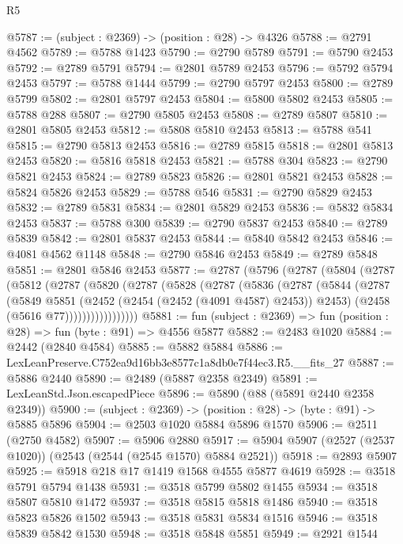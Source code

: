 \begin{lexlean}{R5}
\begin{coremodule}
@5787 := (subject : @2369) -> (position : @28) -> @4326
@5788 := @2791 @4562
@5789 := @5788 @1423
@5790 := @2790 @5789
@5791 := @5790 @2453
@5792 := @2789 @5791
@5794 := @2801 @5789 @2453
@5796 := @5792 @5794 @2453
@5797 := @5788 @1444
@5799 := @2790 @5797 @2453
@5800 := @2789 @5799
@5802 := @2801 @5797 @2453
@5804 := @5800 @5802 @2453
@5805 := @5788 @288
@5807 := @2790 @5805 @2453
@5808 := @2789 @5807
@5810 := @2801 @5805 @2453
@5812 := @5808 @5810 @2453
@5813 := @5788 @541
@5815 := @2790 @5813 @2453
@5816 := @2789 @5815
@5818 := @2801 @5813 @2453
@5820 := @5816 @5818 @2453
@5821 := @5788 @304
@5823 := @2790 @5821 @2453
@5824 := @2789 @5823
@5826 := @2801 @5821 @2453
@5828 := @5824 @5826 @2453
@5829 := @5788 @546
@5831 := @2790 @5829 @2453
@5832 := @2789 @5831
@5834 := @2801 @5829 @2453
@5836 := @5832 @5834 @2453
@5837 := @5788 @300
@5839 := @2790 @5837 @2453
@5840 := @2789 @5839
@5842 := @2801 @5837 @2453
@5844 := @5840 @5842 @2453
@5846 := @4081 @4562 @1148
@5848 := @2790 @5846 @2453
@5849 := @2789 @5848
@5851 := @2801 @5846 @2453
@5877 := @2787
    (@5796
      (@2787
        (@5804
          (@2787
            (@5812
              (@2787
                (@5820
                  (@2787
                    (@5828
                      (@2787
                        (@5836
                          (@2787
                            (@5844
                              (@2787
                                (@5849
                                  @5851
                                  (@2452 (@2454 (@2452 (@4091 @4587) @2453)) @2453)
                                  (@2458 (@5616 @77)))))))))))))))))
@5881 := fun (subject : @2369) => fun (position : @28) => fun (byte : @91) => @4556 @5877
@5882 := @2483 @1020
@5884 := @2442 (@2840 @4584)
@5885 := @5882 @5884
@5886 := LexLeanPreserve.C752ea9d16bb3e8577c1a8db0e7f44ec3.R5.__fits_27
@5887 := @5886 @2440
@5890 := @2489 (@5887 @2358 @2349)
@5891 := LexLeanStd.Json.escapedPiece
@5896 := @5890 (@88 (@5891 @2440 @2358 @2349))
@5900 := (subject : @2369) -> (position : @28) -> (byte : @91) -> @5885 @5896
@5904 := @2503 @1020 @5884 @5896 @1570
@5906 := @2511 (@2750 @4582)
@5907 := @5906 @2880
@5917 := @5904 @5907 (@2527 (@2537 @1020)) (@2543 (@2544 (@2545 @1570) @5884 @2521))
@5918 := @2893 @5907
@5925 := @5918 @218 @17 @1419 @1568 @4555 @5877 @4619
@5928 := @3518 @5791 @5794 @1438
@5931 := @3518 @5799 @5802 @1455
@5934 := @3518 @5807 @5810 @1472
@5937 := @3518 @5815 @5818 @1486
@5940 := @3518 @5823 @5826 @1502
@5943 := @3518 @5831 @5834 @1516
@5946 := @3518 @5839 @5842 @1530
@5948 := @3518 @5848 @5851
@5949 := @2921 @1544

\end{coremodule}
\end{lexlean}
